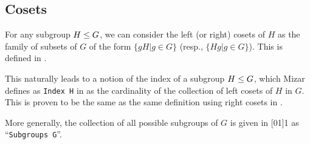 \subsection{Cosets}
For any subgroup $H\leq G$, we can consider the left (or right)
cosets of $H$ as the family of subsets of $G$ of the form
$\{gH|g\in G\}$ (resp., $\{Hg|g\in G\}$). This is defined in
.

This naturally leads to a notion of the index of a subgroup $H\leq G$,
which Mizar defines as \lstinline{Index H} in
 as the
cardinality of the collection of left cosets of $H$ in $G$. This is
proven to be the same as the same definition using right cosets in
.

More generally, the collection of all possible subgroups of $G$ is given
in [01]{1} as
``\lstinline{Subgroups G}''.
